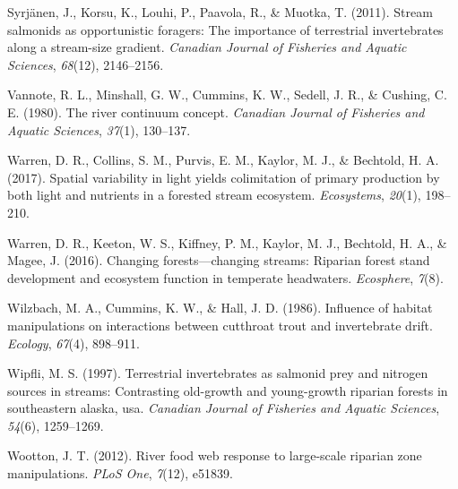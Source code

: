\documentclass[double,12pt]{beavtex}
\begin{document}
  \hypertarget{ref-Syrjanen2011}{}
  Syrjänen, J., Korsu, K., Louhi, P., Paavola, R., \& Muotka, T. (2011).
  Stream salmonids as opportunistic foragers: The importance of
  terrestrial invertebrates along a stream-size gradient. \emph{Canadian
  Journal of Fisheries and Aquatic Sciences}, \emph{68}(12), 2146--2156.
  
  \hypertarget{ref-Vannote1980}{}
  Vannote, R. L., Minshall, G. W., Cummins, K. W., Sedell, J. R., \&
  Cushing, C. E. (1980). The river continuum concept. \emph{Canadian
  Journal of Fisheries and Aquatic Sciences}, \emph{37}(1), 130--137.
  
  \hypertarget{ref-Warren2017}{}
  Warren, D. R., Collins, S. M., Purvis, E. M., Kaylor, M. J., \&
  Bechtold, H. A. (2017). Spatial variability in light yields colimitation
  of primary production by both light and nutrients in a forested stream
  ecosystem. \emph{Ecosystems}, \emph{20}(1), 198--210.
  
  \hypertarget{ref-Warren2016}{}
  Warren, D. R., Keeton, W. S., Kiffney, P. M., Kaylor, M. J., Bechtold,
  H. A., \& Magee, J. (2016). Changing forests---changing streams:
  Riparian forest stand development and ecosystem function in temperate
  headwaters. \emph{Ecosphere}, \emph{7}(8).
  
  \hypertarget{ref-Wilzbach1986}{}
  Wilzbach, M. A., Cummins, K. W., \& Hall, J. D. (1986). Influence of
  habitat manipulations on interactions between cutthroat trout and
  invertebrate drift. \emph{Ecology}, \emph{67}(4), 898--911.
  
  \hypertarget{ref-Wipfli1997}{}
  Wipfli, M. S. (1997). Terrestrial invertebrates as salmonid prey and
  nitrogen sources in streams: Contrasting old-growth and young-growth
  riparian forests in southeastern alaska, usa. \emph{Canadian Journal of
  Fisheries and Aquatic Sciences}, \emph{54}(6), 1259--1269.
  
  \hypertarget{ref-Wootton2012}{}
  Wootton, J. T. (2012). River food web response to large-scale riparian
  zone manipulations. \emph{PLoS One}, \emph{7}(12), e51839.
\end{document}
